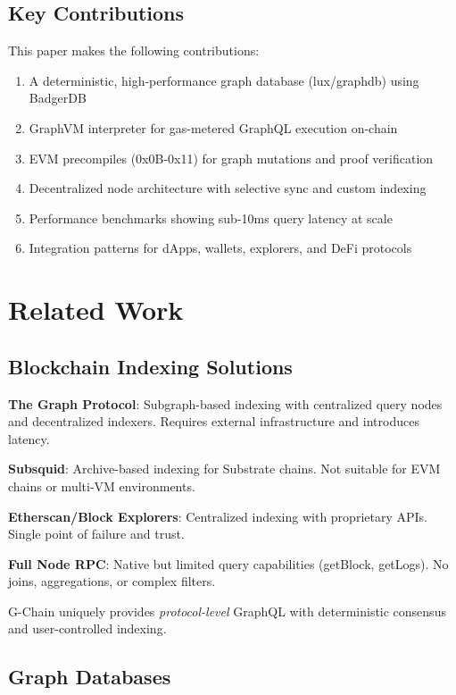 \documentclass[11pt,a4paper]{article}
\begin{document}
\subsection{Key Contributions}

This paper makes the following contributions:

\begin{enumerate}
\item A deterministic, high-performance graph database (lux/graphdb) using BadgerDB
\item GraphVM interpreter for gas-metered GraphQL execution on-chain
\item EVM precompiles (0x0B-0x11) for graph mutations and proof verification
\item Decentralized node architecture with selective sync and custom indexing
\item Performance benchmarks showing sub-10ms query latency at scale
\item Integration patterns for dApps, wallets, explorers, and DeFi protocols
\end{enumerate}

\section{Related Work}

\subsection{Blockchain Indexing Solutions}

\textbf{The Graph Protocol}: Subgraph-based indexing with centralized query nodes and decentralized indexers. Requires external infrastructure and introduces latency.

\textbf{Subsquid}: Archive-based indexing for Substrate chains. Not suitable for EVM chains or multi-VM environments.

\textbf{Etherscan/Block Explorers}: Centralized indexing with proprietary APIs. Single point of failure and trust.

\textbf{Full Node RPC}: Native but limited query capabilities (getBlock, getLogs). No joins, aggregations, or complex filters.

G-Chain uniquely provides \textit{protocol-level} GraphQL with deterministic consensus and user-controlled indexing.

\subsection{Graph Databases}
\end{document}
